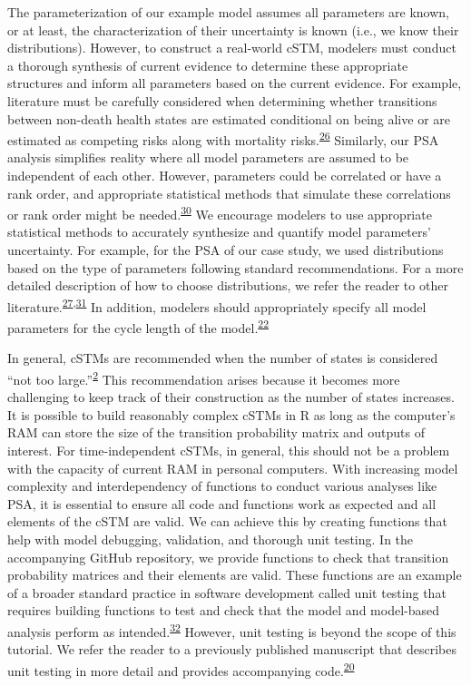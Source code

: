 \documentclass[
]{article}
\begin{document}
The parameterization of our example model assumes all parameters are known, or at least, the characterization of their uncertainty is known (i.e., we know their distributions). However, to construct a real-world cSTM, modelers must conduct a thorough synthesis of current evidence to determine these appropriate structures and inform all parameters based on the current evidence. For example, literature must be carefully considered when determining whether transitions between non-death health states are estimated conditional on being alive or are estimated as competing risks along with mortality risks.\textsuperscript{\protect\hyperlink{ref-Briggs2012}{26}} Similarly, our PSA analysis simplifies reality where all model parameters are assumed to be independent of each other. However, parameters could be correlated or have a rank order, and appropriate statistical methods that simulate these correlations or rank order might be needed.\textsuperscript{\protect\hyperlink{ref-Goldhaber-Fiebert2015}{30}} We encourage modelers to use appropriate statistical methods to accurately synthesize and quantify model parameters' uncertainty. For example, for the PSA of our case study, we used distributions based on the type of parameters following standard recommendations. For a more detailed description of how to choose distributions, we refer the reader to other literature.\textsuperscript{\protect\hyperlink{ref-Briggs2002}{27},\protect\hyperlink{ref-Briggs2003}{31}} In addition, modelers should appropriately specify all model parameters for the cycle length of the model.\textsuperscript{\protect\hyperlink{ref-Hunink2014}{22}}

In general, cSTMs are recommended when the number of states is considered ``not too large.''\textsuperscript{\protect\hyperlink{ref-Siebert2012c}{2}} This recommendation arises because it becomes more challenging to keep track of their construction as the number of states increases. It is possible to build reasonably complex cSTMs in R as long as the computer's RAM can store the size of the transition probability matrix and outputs of interest. For time-independent cSTMs, in general, this should not be a problem with the capacity of current RAM in personal computers. With increasing model complexity and interdependency of functions to conduct various analyses like PSA, it is essential to ensure all code and functions work as expected and all elements of the cSTM are valid. We can achieve this by creating functions that help with model debugging, validation, and thorough unit testing. In the accompanying GitHub repository, we provide functions to check that transition probability matrices and their elements are valid. These functions are an example of a broader standard practice in software development called unit testing that requires building functions to test and check that the model and model-based analysis perform as intended.\textsuperscript{\protect\hyperlink{ref-Wickham2021}{32}} However, unit testing is beyond the scope of this tutorial. We refer the reader to a previously published manuscript that describes unit testing in more detail and provides accompanying code.\textsuperscript{\protect\hyperlink{ref-Alarid-Escudero2019e}{20}}
\end{document}
